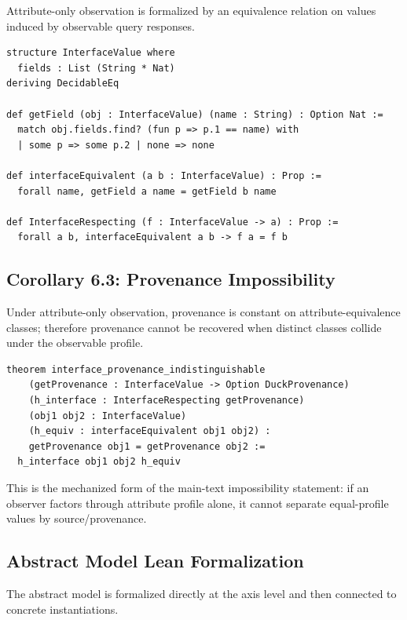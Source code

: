 Attribute-only observation is formalized by an equivalence relation on values induced by observable query responses.

\begin{lstlisting}[style=lean]
structure InterfaceValue where
  fields : List (String * Nat)
deriving DecidableEq

def getField (obj : InterfaceValue) (name : String) : Option Nat :=
  match obj.fields.find? (fun p => p.1 == name) with
  | some p => some p.2 | none => none

def interfaceEquivalent (a b : InterfaceValue) : Prop :=
  forall name, getField a name = getField b name

def InterfaceRespecting (f : InterfaceValue -> a) : Prop :=
  forall a b, interfaceEquivalent a b -> f a = f b
\end{lstlisting}

\subsection{Corollary 6.3: Provenance Impossibility}\label{corollary-6.3-interface-only-cannot-provide-provenance}

Under attribute-only observation, provenance is constant on attribute-equivalence classes; therefore provenance cannot be recovered when distinct classes collide under the observable profile.

\begin{lstlisting}[style=lean]
theorem interface_provenance_indistinguishable
    (getProvenance : InterfaceValue -> Option DuckProvenance)
    (h_interface : InterfaceRespecting getProvenance)
    (obj1 obj2 : InterfaceValue)
    (h_equiv : interfaceEquivalent obj1 obj2) :
    getProvenance obj1 = getProvenance obj2 :=
  h_interface obj1 obj2 h_equiv
\end{lstlisting}

This is the mechanized form of the main-text impossibility statement: if an observer factors through attribute profile alone, it cannot separate equal-profile values by source/provenance.

\subsection{Abstract Model Lean Formalization}\label{abstract-model-lean-formalization}

The abstract model is formalized directly at the axis level and then connected to concrete instantiations.

